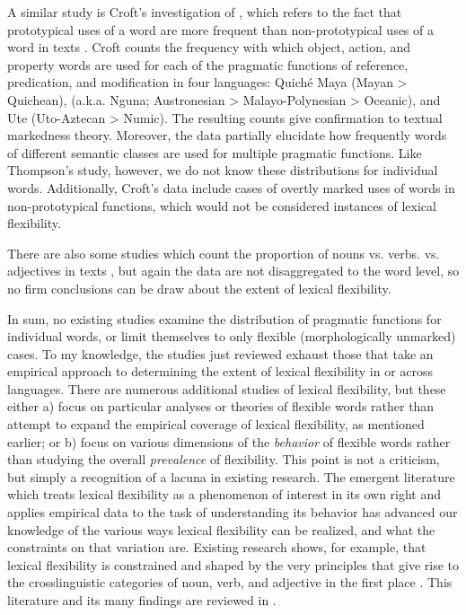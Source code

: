 A similar study is Croft's \parencite*[§2.5]{Croft1991} investigation of , which refers to the fact that prototypical uses of a word are more frequent than non-prototypical uses of a word in texts . Croft counts the frequency with which object, action, and property words are used for each of the pragmatic functions of reference, predication, and modification in four languages: Quiché Maya (Mayan > Quichean),  (a.k.a. Nguna; Austronesian > Malayo-Polynesian > Oceanic), and Ute (Uto-Aztecan > Numic). The resulting counts give confirmation to textual markedness theory. Moreover, the data partially elucidate how frequently words of different semantic classes are used for multiple pragmatic functions. Like Thompson's \parencite*{Thompson1989} study, however, we do not know these distributions for individual words. Additionally, Croft's data include cases of overtly marked uses of words in non-prototypical functions, which would not be considered instances of lexical flexibility.

There are also some studies which count the proportion of nouns vs. verbs. vs. adjectives in  texts \parencites{Hudson1994}{PolinskyMagyar2020}, but again the data are not disaggregated to the word level, so no firm conclusions can be draw about the extent of lexical flexibility.

In sum, no existing studies examine the distribution of pragmatic functions for individual words, or limit themselves to only flexible (morphologically unmarked) cases. To my knowledge, the studies just reviewed exhaust those that take an empirical approach to determining the extent of lexical flexibility in or across languages. There are numerous additional studies of lexical flexibility, but these either a) focus on particular analyses or theories of flexible words rather than attempt to expand the empirical coverage of lexical flexibility, as mentioned earlier; or b) focus on various dimensions of the \emph{behavior} of flexible words rather than studying the overall \emph{prevalence} of flexibility. This point is not a criticism, but simply a recognition of a lacuna in existing research. The emergent literature which treats lexical flexibility as a phenomenon of interest in its own right and applies empirical data to the task of understanding its behavior has advanced our knowledge of the various ways lexical flexibility can be realized, and what the constraints on that variation are. Existing research shows, for example, that lexical flexibility is constrained and shaped by the very principles that give rise to the crosslinguistic categories of noun, verb, and adjective in the first place \parencites{Croft2000}{Croft2005}{CroftvanLier2012}. This literature and its many findings are reviewed in .

